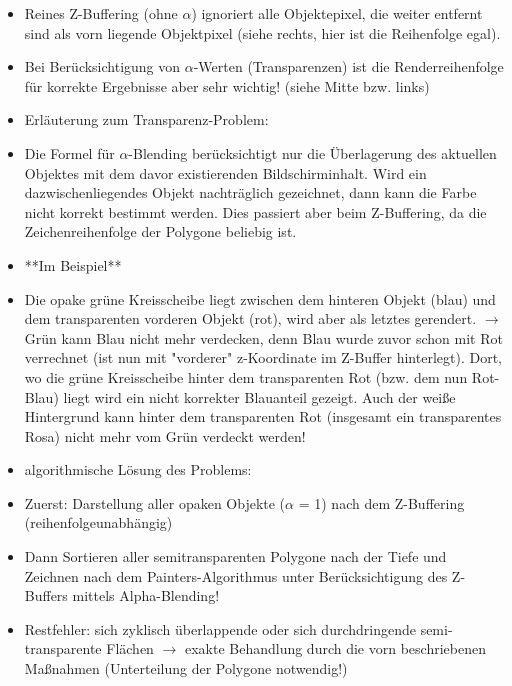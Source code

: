 \documentclass[10pt,landscape]{article}
\begin{document}
\begin{multicols}{3}
{  %
  
  \begin{itemize}
    \item Reines Z-Buffering (ohne $\alpha$) ignoriert alle Objektepixel, die weiter entfernt sind als vorn liegende Objektpixel (siehe rechts, hier ist die Reihenfolge egal).
    \item Bei Berücksichtigung von $\alpha$-Werten (Transparenzen) ist die Renderreihenfolge für korrekte Ergebnisse aber sehr wichtig! (siehe Mitte bzw. links)
    \item Erläuterung zum Transparenz-Problem:
    \item Die Formel für $\alpha$-Blending berücksichtigt nur die Überlagerung des aktuellen Objektes mit dem davor existierenden Bildschirminhalt. Wird ein dazwischenliegendes Objekt nachträglich gezeichnet, dann kann die Farbe nicht korrekt bestimmt werden. Dies passiert aber beim Z-Buffering, da die Zeichenreihenfolge der Polygone beliebig ist.
    \item **Im Beispiel**
    \item Die opake grüne Kreisscheibe liegt zwischen dem hinteren Objekt (blau) und dem transparenten vorderen Objekt (rot), wird aber als letztes gerendert. $\rightarrow$ Grün kann Blau nicht mehr verdecken, denn Blau wurde zuvor schon mit Rot verrechnet (ist nun mit "vorderer" z-Koordinate im Z-Buffer hinterlegt). Dort, wo die grüne Kreisscheibe hinter dem transparenten Rot (bzw. dem nun Rot-Blau) liegt wird ein nicht korrekter Blauanteil gezeigt. Auch der weiße Hintergrund kann hinter dem transparenten Rot (insgesamt ein transparentes Rosa) nicht mehr vom Grün verdeckt werden!
    \item algorithmische Lösung des Problems:
    \item Zuerst: Darstellung aller opaken Objekte ($\alpha$ = 1) nach dem Z-Buffering (reihenfolgeunabhängig)
    \item Dann Sortieren aller semitransparenten Polygone nach der Tiefe und Zeichnen nach dem Painters-Algorithmus unter Berücksichtigung des Z-Buffers mittels Alpha-Blending!
    \item Restfehler: sich zyklisch überlappende oder sich durchdringende semi-transparente Flächen $\rightarrow$ exakte Behandlung durch die vorn beschriebenen Maßnahmen (Unterteilung der Polygone notwendig!)
  \end{itemize}
  
}
\end{multicols}
\end{document}
